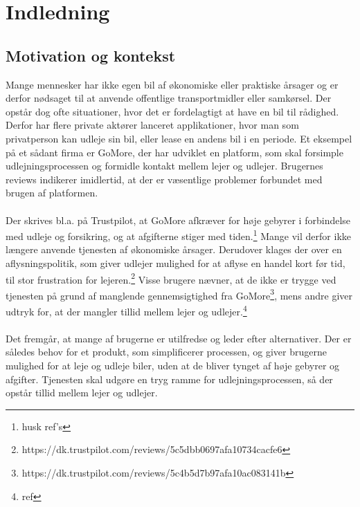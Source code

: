 \documentclass[Rapport/Rapport_main.tex]{subfiles}
\begin{document}
\section{Indledning}
\subsection{Motivation og kontekst}
Mange mennesker har ikke egen bil af økonomiske eller praktiske årsager og er derfor nødsaget til at anvende offentlige transportmidler eller samkørsel. Der opstår dog ofte situationer, hvor det er fordelagtigt at have en bil til rådighed. Derfor har flere private aktører lanceret applikationer, hvor man som privatperson kan udleje sin bil, eller lease en andens bil i en periode. Et eksempel på et sådant firma er GoMore, der har udviklet en platform, som skal forsimple udlejningsprocessen og formidle kontakt mellem lejer og udlejer. Brugernes reviews indikerer imidlertid, at der er væsentlige problemer forbundet med brugen af platformen. \\\\Der skrives bl.a. på Trustpilot, at GoMore afkræver for høje gebyrer i forbindelse med udleje og forsikring, og at afgifterne stiger med tiden.\footnote{husk ref's} Mange vil derfor ikke længere anvende tjenesten af økonomiske årsager. Derudover klages der over en aflysningspolitik, som giver udlejer mulighed for at aflyse en handel kort før tid, til stor frustration for lejeren.\footnote{https://dk.trustpilot.com/reviews/5c5dbb0697afa10734cacfe6} Visse brugere nævner, at de ikke er trygge ved tjenesten på grund af manglende gennemsigtighed fra GoMore\footnote{https://dk.trustpilot.com/reviews/5c4b5d7b97afa10ac083141b}, mens andre giver udtryk for, at der mangler tillid mellem lejer og udlejer.\footnote{ref} \\\\Det fremgår, at mange af brugerne er utilfredse og leder efter alternativer. Der er således behov for et produkt, som simplificerer processen, og giver brugerne mulighed for at leje og udleje biler, uden at de bliver tynget af høje gebyrer og afgifter. Tjenesten skal udgøre en tryg ramme for udlejningsprocessen, så der opstår tillid mellem lejer og udlejer.
\end{document}
